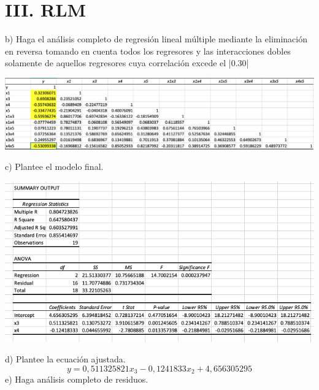 \documentclass[a4paper,12pt]{article}
\begin{document}
\section{III. RLM}
b) Haga el análisis completo de regresión lineal múltiple mediante la eliminación en reversa tomando en cuenta todos los regresores y las interacciones dobles solamente de aquellos regresores cuya correlación excede el |0.30|\newline\newline
 \begin{center}
        \includegraphics[scale=0.4]{model2.png}
\end{center}
c) Plantee el modelo final.\newline\newline
 \begin{center}
        \includegraphics[scale=0.5]{modelo_multi.png}
\end{center}

d) Plantee la ecuación ajustada.\newline\newline
$$y=0,511325821x_3-0,1241833x_2 +4,656305295$$
e) Haga análisis completo de residuos. \newline\newline
\end{document}
